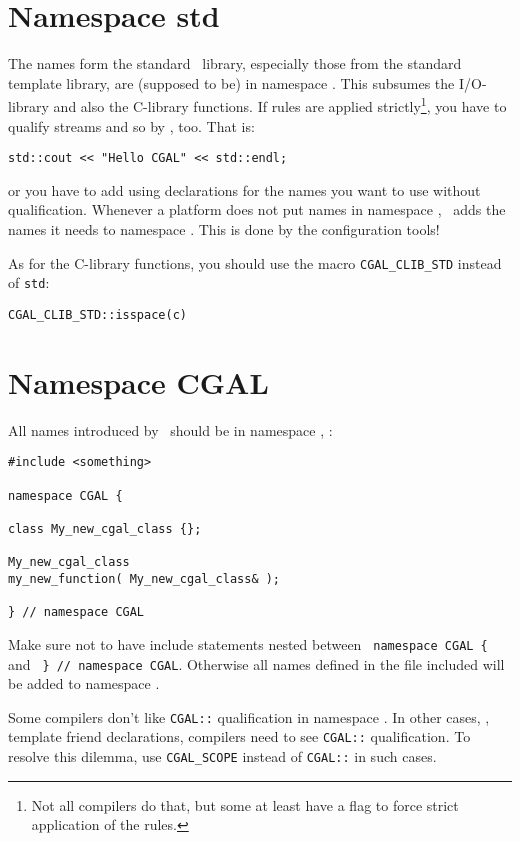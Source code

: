 \section{Namespace std}
The names form the standard \CC\ library, especially those from the standard
template library, are (supposed to be) in namespace . This subsumes
the I/O-library%
and also the C-library%
functions. 
If rules are applied strictly\footnote{Not all compilers do that, but some 
at least have a flag to force strict application of the rules.}, you have to
qualify streams and so by , too.  That is:
\begin{verbatim}
std::cout << "Hello CGAL" << std::endl;
\end{verbatim}
or you have to add using declarations for the names you want to use without
 qualification. Whenever a platform does not put names in namespace
, \cgal\ adds the names it needs to namespace . This
is done by the configuration tools!

As for the C-library functions, you should use the macro 
\texttt{CGAL\_CLIB\_STD} instead of \texttt{std}:
\begin{verbatim}
CGAL_CLIB_STD::isspace(c)
\end{verbatim}

\section{Namespace CGAL}
All names introduced by \cgal\ should be in namespace , \eg: 
\begin{verbatim}
#include <something>

namespace CGAL {

class My_new_cgal_class {};

My_new_cgal_class 
my_new_function( My_new_cgal_class& );

} // namespace CGAL
\end{verbatim}
Make sure not to have include statements nested between 
\verb+ namespace CGAL { + and \verb+ } // namespace CGAL+.
Otherwise all names defined in the file included will be 
added to namespace .

Some compilers don't like \texttt{CGAL::} qualification in
namespace . In other cases, \eg, template friend declarations,%
compilers need to see \texttt{CGAL::} qualification. To resolve this
dilemma, use \texttt{CGAL\_SCOPE} instead of \texttt{CGAL::} in such cases. 

